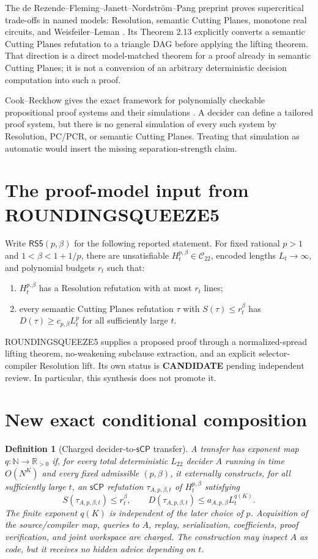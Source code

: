 \documentclass[11pt]{article}
\newtheorem{definition}[theorem]{Definition}
\newcommand{\Ltwo}{L_{22}}
\newcommand{\sCP}{\mathsf{sCP}}
\newcommand{\CAND}{\textbf{CANDIDATE}}
\begin{document}
The de Rezende--Fleming--Janett--Nordstr\"om--Pang preprint proves
supercritical trade-offs in named models: Resolution, semantic Cutting
Planes, monotone real circuits, and Weisfeiler--Leman \cite{tradeoff}. Its
Theorem 2.13 explicitly converts a semantic Cutting Planes refutation to a
triangle DAG before applying the lifting theorem. That direction is a
direct model-matched theorem for a proof already in semantic Cutting Planes;
it is not a conversion of an arbitrary deterministic decision computation
into such a proof.

Cook--Reckhow gives the exact framework for polynomially checkable
propositional proof systems and their simulations \cite{cr}. A decider can
define a tailored proof system, but there is no general simulation of every
such system by Resolution, PC/PCR, or semantic Cutting Planes. Treating that
simulation as automatic would insert the missing separation-strength claim.

\section{The proof-model input from ROUNDINGSQUEEZE5}
Write $\mathsf{RS5}(p,\beta)$ for the following reported statement. For fixed
rational $p>1$ and $1<\beta<1+1/p$, there are unsatisfiable
$H^{p,\beta}_t\in\mathcal C_{22}$, encoded lengths $L_t\to\infty$, and
polynomial budgets $r_t$ such that:
\begin{enumerate}
\item $H^{p,\beta}_t$ has a Resolution refutation with at most $r_t$ lines;
\item every semantic Cutting Planes refutation $\tau$ with
  $S(\tau)\le r_t^\beta$ has
  $D(\tau)\ge c_{p,\beta}L_t^p$ for all sufficiently large $t$.
\end{enumerate}
ROUNDINGSQUEEZE5 supplies a proposed proof through a normalized-spread
lifting theorem, no-weakening subclause extraction, and an explicit
selector-compiler Resolution lift. Its own status is \CAND{} pending
independent review. In particular, this synthesis does not promote it.

\section{New exact conditional composition}
\begin{definition}[Charged decider-to-$\sCP$ transfer]
A transfer has exponent map $q:\mathbb N\to\mathbb R_{>0}$ if, for every
total deterministic $\Ltwo$ decider $A$ running in time $O(N^K)$ and every
fixed admissible $(p,\beta)$, it externally constructs, for all sufficiently
large $t$, an $\sCP$ refutation $\tau_{A,p,\beta,t}$ of
$H^{p,\beta}_t$ satisfying
\[
 S(\tau_{A,p,\beta,t})\le r_t^\beta,
 \qquad
 D(\tau_{A,p,\beta,t})\le a_{A,p,\beta}L_t^{q(K)}.       \tag{2}
\]
The finite exponent $q(K)$ is independent of the later choice of $p$.
Acquisition of the source/compiler map, queries to $A$, replay,
serialization, coefficients, proof verification, and joint workspace are
charged. The construction may inspect $A$ as code, but it receives no hidden
advice depending on $t$.
\end{definition}
\end{document}
